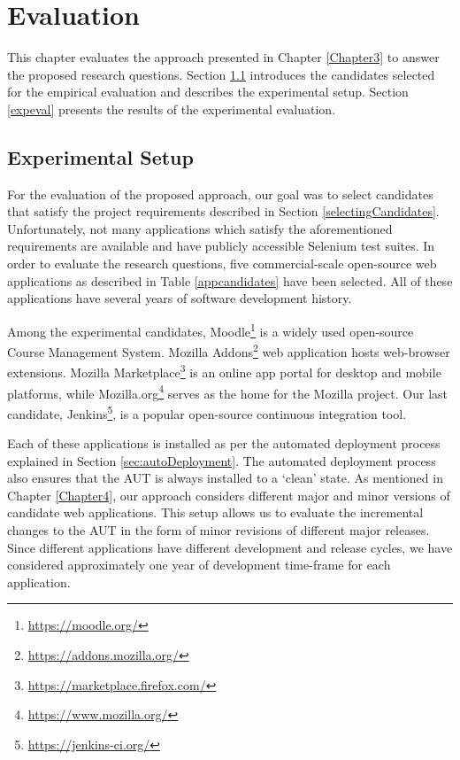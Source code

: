 \chapter{Evaluation} %

\label{Chapter5} %

This chapter evaluates the approach presented in Chapter \ref{Chapter3} to answer the proposed research questions. Section \ref{evalsetup} introduces the candidates selected for the empirical evaluation and describes the experimental setup. Section \ref{expeval} presents the results of the experimental evaluation.  

\section{Experimental Setup}
\label{evalsetup}
For the evaluation of the proposed approach, our goal was to select candidates that satisfy the project requirements described in Section \ref{selectingCandidates}. Unfortunately, not many applications which satisfy the aforementioned requirements are available and have publicly accessible Selenium test suites. In order to evaluate the research questions, five commercial-scale open-source web applications as described in Table \ref{appcandidates} have been selected. All of these applications have several years of software development history.

Among the experimental candidates, Moodle\footnote{\url{https://moodle.org/}} is a widely used open-source Course Management System. Mozilla Addons\footnote{\url{https://addons.mozilla.org/}} web application hosts web-browser extensions. Mozilla Marketplace\footnote{\url{https://marketplace.firefox.com/}} is an online app portal for desktop and mobile platforms, while Mozilla.org\footnote{\url{https://www.mozilla.org/}} serves as the home for the Mozilla project. Our last candidate, Jenkins\footnote{\url{https://jenkins-ci.org/}}, is a popular open-source continuous integration tool. 
  
Each of these applications is installed as per the automated deployment process explained in Section \ref{sec:autoDeployment}. The automated deployment process also ensures that the AUT is always installed to a `clean' state. As mentioned in Chapter \ref{Chapter4}, our approach considers different major and minor versions of candidate web applications. This setup allows us to evaluate the incremental changes to the AUT in the form of minor revisions of different major releases. 
Since different applications have different development and release cycles, we have considered approximately one year of development time-frame for each application. 

